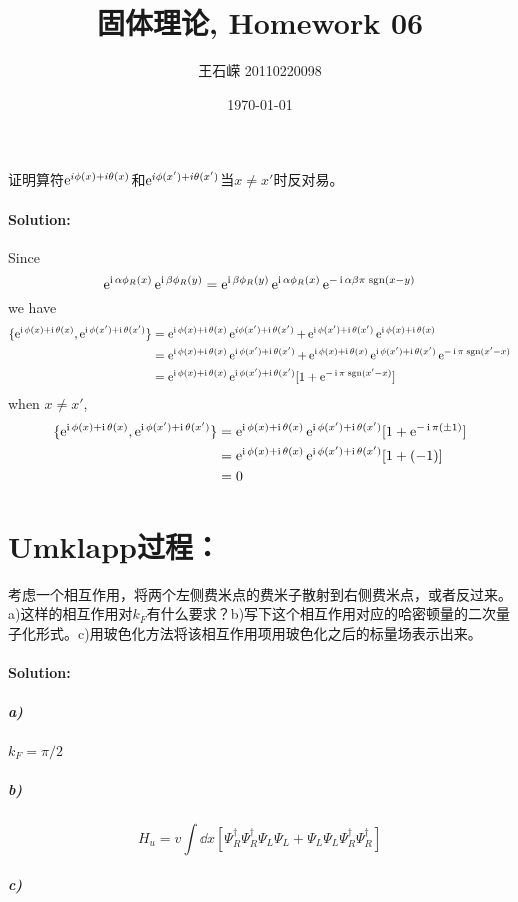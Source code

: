 \documentclass[a4paper]{article}
\title{固体理论, Homework 06}
\author{王石嵘 20110220098}
\date{\today} %
\numberwithin{equation}{section}
\begin{document}
\maketitle




\section{}
证明算符$ \e^{i\phi(x)+i\theta(x)} $和$  \e^{i\phi(x')+i\theta(x')} $当$ x\neq x' $时反对易。
\paragraph{Solution:}
Since
\begin{equation}\label{key}
	\e^{\I\alpha \phi_R(x)} \e^{\I\beta \phi_R(y)} = \e^{\I\beta \phi_R(y)}\e^{\I\alpha \phi_R(x)} \e^{-\I\alpha\beta\pi\;\mathrm{sgn}(x-y)}
\end{equation}
we have
\begin{align}\label{key}
\{\e^{\I\phi(x)+\I\theta(x)}, \e^{\I\phi(x')+\I\theta(x')}\} &= \e^{\I\phi(x)+\I\theta(x)} \e^{i\phi(x')+\I\theta(x')} + \e^{\I\phi(x')+\I\theta(x')} \e^{\I\phi(x)+\I\theta(x)} \notag\\
&= \e^{\I\phi(x)+\I\theta(x)} \e^{\I\phi(x')+\I\theta(x')} + \e^{\I\phi(x)+\I\theta(x)} \e^{\I\phi(x')+\I\theta(x')} \e^{-\I \pi\; \mathrm{sgn}(x'-x)} \notag\\
&= \e^{\I\phi(x)+\I\theta(x)} \e^{\I\phi(x')+\I\theta(x')} [1 +  \e^{-\I \pi\; \mathrm{sgn}(x'-x)} ]
\end{align}
when $ x \neq x' $,
\begin{align}\label{key}
\{\e^{\I\phi(x)+\I\theta(x)}, \e^{\I\phi(x')+\I\theta(x')}\} 
	&= \e^{\I\phi(x)+\I\theta(x)} \e^{\I\phi(x')+\I\theta(x')} [1 +  \e^{-\I \pi(\pm 1)} ] \notag\\
	&= \e^{\I\phi(x)+\I\theta(x)} \e^{\I\phi(x')+\I\theta(x')} [1 +  (-1)] \notag\\
	&= 0
\end{align}

\section{Umklapp过程：}
考虑一个相互作用，将两个左侧费米点的费米子散射到右侧费米点，或者反过来。a)这样的相互作用对$ k_F $有什么要求？b)写下这个相互作用对应的哈密顿量的二次量子化形式。c)用玻色化方法将该相互作用项用玻色化之后的标量场表示出来。
\paragraph{Solution:}
\subparagraph{a)}
$ 	k_F = \pi/2 $
\subparagraph{b)}
\begin{equation}\label{key}
	H_u = v \int \dd x [\Psi_R^\dagger \Psi_R^\dagger \Psi_L\Psi_L + \Psi_L\Psi_L \Psi_R^\dagger \Psi_R^\dagger]
\end{equation}

\subparagraph{c)}
\end{document}
